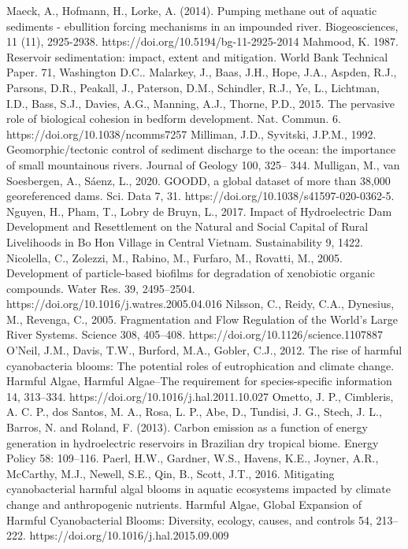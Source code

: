 \begin{thebibliography}{}
Maeck, A., Hofmann, H., Lorke, A. (2014). Pumping methane out of aquatic sediments - ebullition forcing mechanisms in an impounded river. Biogeosciences, 11 (11), 2925-2938. https://doi.org/10.5194/bg-11-2925-2014
Mahmood, K. 1987. Reservoir sedimentation: impact, extent and mitigation. World Bank Technical Paper. 71, Washington D.C..
Malarkey, J., Baas, J.H., Hope, J.A., Aspden, R.J., Parsons, D.R., Peakall, J., Paterson, D.M., Schindler, R.J., Ye, L., Lichtman, I.D., Bass, S.J., Davies, A.G., Manning, A.J., Thorne, P.D., 2015. The pervasive role of biological cohesion in bedform development. Nat. Commun. 6. https://doi.org/10.1038/ncomms7257
Milliman, J.D., Syvitski, J.P.M., 1992. Geomorphic/tectonic control of sediment discharge to the ocean: the importance of small mountainous rivers. Journal of Geology 100, 325– 344.
Mulligan, M., van Soesbergen, A., Sáenz, L., 2020. GOODD, a global dataset of more than 38,000 georeferenced dams. Sci. Data 7, 31. https://doi.org/10.1038/s41597-020-0362-5.
Nguyen, H., Pham, T., Lobry de Bruyn, L., 2017. Impact of Hydroelectric Dam Development and Resettlement on the Natural and Social Capital of Rural Livelihoods in Bo Hon Village in Central Vietnam. Sustainability 9, 1422.
Nicolella, C., Zolezzi, M., Rabino, M., Furfaro, M., Rovatti, M., 2005. Development of particle-based biofilms for degradation of xenobiotic organic compounds. Water Res. 39, 2495–2504. https://doi.org/10.1016/j.watres.2005.04.016
Nilsson, C., Reidy, C.A., Dynesius, M., Revenga, C., 2005. Fragmentation and Flow Regulation of the World’s Large River Systems. Science 308, 405–408. https://doi.org/10.1126/science.1107887
O’Neil, J.M., Davis, T.W., Burford, M.A., Gobler, C.J., 2012. The rise of harmful cyanobacteria blooms: The potential roles of eutrophication and climate change. Harmful Algae, Harmful Algae--The requirement for species-specific information 14, 313–334. https://doi.org/10.1016/j.hal.2011.10.027
Ometto, J. P., Cimbleris, A. C. P., dos Santos, M. A., Rosa, L. P., Abe, D., Tundisi, J. G., Stech, J. L., Barros, N. and Roland, F. (2013). Carbon emission as a function of energy generation in hydroelectric reservoirs in Brazilian dry tropical biome. Energy Policy 58: 109–116.
Paerl, H.W., Gardner, W.S., Havens, K.E., Joyner, A.R., McCarthy, M.J., Newell, S.E., Qin, B., Scott, J.T., 2016. Mitigating cyanobacterial harmful algal blooms in aquatic ecosystems impacted by climate change and anthropogenic nutrients. Harmful Algae, Global Expansion of Harmful Cyanobacterial Blooms: Diversity, ecology, causes, and controls 54, 213–222. https://doi.org/10.1016/j.hal.2015.09.009

\end{thebibliography}
